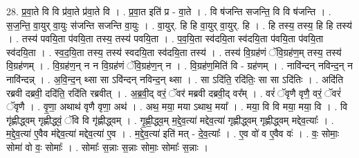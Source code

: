 \documentclass[17pt]{extarticle}
\begin{document}
28. प्र॒वा॒ते वि वि प्र॑वा॒ते प्र॑वा॒ते वि । . प्र॒वा॒त इति॑ प्र - वा॒ते । . वि ष॑जन्ति सजन्ति॒ वि वि ष॑जन्ति । . स॒ज॒न्ति॒ वा॒युर् वा॒युः स॑जन्ति सजन्ति वा॒युः । . वा॒युर्. हि हि वा॒युर् वा॒युर्. हि । . हि तस्य॒ तस्य॒ हि हि तस्य॑ । . तस्य॑ पवयि॒ता प॑वयि॒ता तस्य॒ तस्य॑ पवयि॒ता । . प॒व॒यि॒ता स्व॑दयि॒ता स्व॑दयि॒ता प॑वयि॒ता प॑वयि॒ता स्व॑दयि॒ता । . स्व॒द॒यि॒ता तस्य॒ तस्य॑ स्वदयि॒ता स्व॑दयि॒ता तस्य॑ । . तस्य॑ वि॒ग्रह॑णं ॅवि॒ग्रह॑ण॒म् तस्य॒ तस्य॑ वि॒ग्रह॑णम् । . वि॒ग्रह॑ण॒न् न न वि॒ग्रह॑णं ॅवि॒ग्रह॑ण॒न् न । . वि॒ग्रह॑ण॒मिति॑ वि - ग्रह॑णम् । . नावि॑न्दन् नविन्द॒न् न नावि॑न्दन्न् । . अ॒वि॒न्द॒न् थ्सा सा ऽवि॑न्दन् नविन्द॒न् थ्सा । . सा ऽदि॑ति॒ रदि॑तिः॒ सा सा ऽदि॑तिः । . अदि॑ति रब्रवी दब्रवी॒ ददि॑ति॒ रदि॑ति रब्रवीत् । . अ॒ब्र॒वी॒द् वरं॒ ॅवर॑ मब्रवी दब्रवी॒द् वर᳚म् । . वरं॑ ॅवृणै वृणै॒ वरं॒ ॅवरं॑ ॅवृणै । . वृ॒णा॒ अथाथ॑ वृणै वृणा॒ अथ॑ । . अथ॒ मया॒ मया ऽथाथ॒ मया᳚ । . मया॒ वि वि मया॒ मया॒ वि । . वि गृ॑ह्णीद्ध्वम् गृह्णीद्ध्वं॒ ॅवि वि गृ॑ह्णीद्ध्वम् । . गृ॒ह्णी॒द्ध्व॒म् म॒द्दे॒व॒त्या॑ मद्देव॒त्या॑ गृह्णीद्ध्वम् गृह्णीद्ध्वम् मद्देव॒त्याः᳚ । . म॒द्दे॒व॒त्या॑ ए॒वैव म॑द्देव॒त्या॑ मद्देव॒त्या॑ ए॒व । . म॒द्दे॒व॒त्या॑ इति॑ मत् - दे॒व॒त्याः᳚ । . ए॒व वो॑ व ए॒वैव वः॑ । . वः॒ सोमाः॒ सोमा॑ वो वः॒ सोमाः᳚ । . सोमाः᳚ स॒न्नाः स॒न्नाः सोमाः॒ सोमाः᳚ स॒न्नाः । \newline
\end{document}
